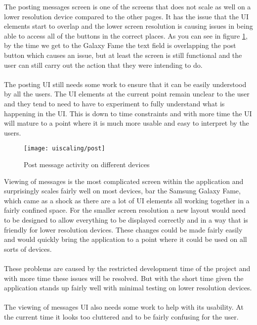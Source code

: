 \noindent
The posting messages screen is one of the screens that does not scale as well on a lower resolution device compared to the other pages. It has the issue that the UI elements start to overlap and the lower screen resolution is causing issues in being able to access all of the buttons in the correct places. As you can see in figure \ref{fig:ui_scaling_post_image}, by the time we get to the Galaxy Fame the text field is overlapping the post button which causes an issue, but at least the screen is still functional and the user can still carry out the action that they were intending to do.\\
\\
The posting UI still needs some work to ensure that it can be easily understood by all the users. The UI elements at the current point remain unclear to the user and they tend to need to have to experiment to fully understand what is happening in the UI. This is down to time constraints and with more time the UI will mature to a point where it is much more usable and easy to interpret by the users.

\begin{figure}[H]
    \centering
    \texttt{[image: uiscaling/post]}
    \caption{Post message activity on different devices}
    \label{fig:ui_scaling_post_image}
\end{figure} 

\noindent
Viewing of messages is the most complicated screen within the application and surprisingly scales fairly well on most devices, bar the Samsung Galaxy Fame, which came as a shock as there are a lot of UI elements all working together in a fairly confined space. For the smaller screen resolution a new layout would need to be designed to allow everything to be displayed correctly and in a way that is friendly for lower resolution devices. These changes could be made fairly easily and would quickly bring the application to a point where it could be used on all sorts of devices.\\
\\
These problems are caused by the restricted development time of the project and with more time these issues will be resolved. But with the short time given the application stands up fairly well with minimal testing on lower resolution devices.\\
\\
The viewing of messages UI also needs some work to help with its usability. At the current time it looks too cluttered and to be fairly confusing for the user.

